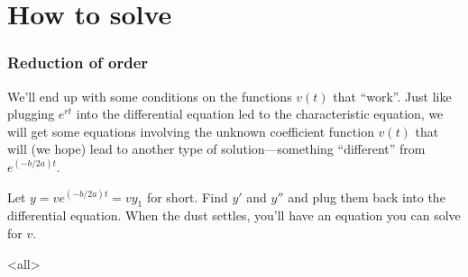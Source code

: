 \section{How to solve}
\label{howtosolve}

\begin{frame}

\frametitle{Reduction of order}
\label{reductionoforder}

We'll end up with some conditions on the functions $ v(t) $ that ``work''. Just like plugging $ e^{rt} $ into the differential equation led to the characteristic equation, we will get some equations involving the unknown coefficient function $ v(t) $ that will (we hope) lead to another type of solution---something ``different'' from $ e^{(-b/2a)t} $.


\pause


Let $ y = v e^{(-b/2a)t} = v y_1 $ for short. Find $ y' $ and $ y'' $ and plug them back into the differential equation. When the dust settles, you'll have an equation you can solve for $ v $.

\end{frame}

\mode<all>


\mode*

